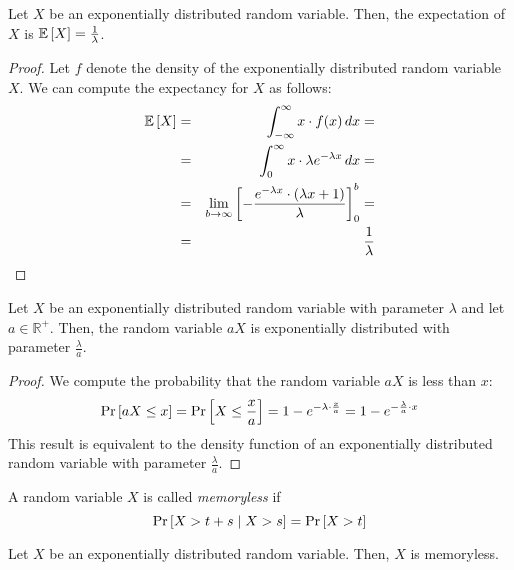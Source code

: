 \begin{theorem}
  \label{thm:exponential-distribution-expectancy}
  Let $X$ be an exponentially distributed random variable. Then, the expectation of $X$ is $\mathbb{E}\left[ X \right] = \frac 1 \lambda$.
\end{theorem}

\begin{proof} Let $f$ denote the density of the exponentially distributed random variable $X$.
  We can compute the expectancy for $X$ as follows:
  \begin{eqnarray*}
    \mathbb{E}\left[ X \right] 
    &=& \int_{-\infty}^\infty x\cdot f(x)\, dx = \\
    &=& \int_{0}^\infty x\cdot \lambda e^{-\lambda x}\, dx = \\
    &=& \lim_{b\rightarrow \infty} \left[ - \frac{e^{-\lambda x}\cdot \left( \lambda x + 1 \right)}{\lambda} \right]_{0}^b = \\
    &=& \frac{1}{\lambda}
  \end{eqnarray*}
\end{proof}

\begin{theorem}[Scalability]
  \label{thm:expoenential-distr-scalability}
  Let $X$ be an exponentially distributed random variable with parameter $\lambda$ and let $a\in \mathbb{R}^+$. Then, the random variable $aX$ is exponentially distributed with parameter $\frac{\lambda}{a}$.
\end{theorem}

\begin{proof}
  We compute the probability that the random variable $aX$ is less than $x$:
  \begin{equation*}
    \operatorname{Pr}\left[aX \leq x\right] 
    = \operatorname{Pr}\left[X \leq \frac{x}{a}\right]
    = 1 - e^{-\lambda \cdot \frac{x}{a}}
    = 1 - e^{-\frac{\lambda}{a} \cdot x}
  \end{equation*}
  This result is equivalent to the density function of an exponentially distributed random variable with parameter $\frac{\lambda}{a}$.
\end{proof}

\begin{definition}[Memorylessness]
  A random variable $X$ is called \emph{memoryless} if
  \begin{equation*}
    \operatorname{Pr}\left[X>t+s \mid X>s\right] = \operatorname{Pr}\left[X > t\right]
  \end{equation*}
\end{definition}

\begin{theorem}
  \label{thm:exponential-memoryless}
  Let $X$ be an exponentially distributed random variable. Then, $X$ is memoryless.
\end{theorem}


